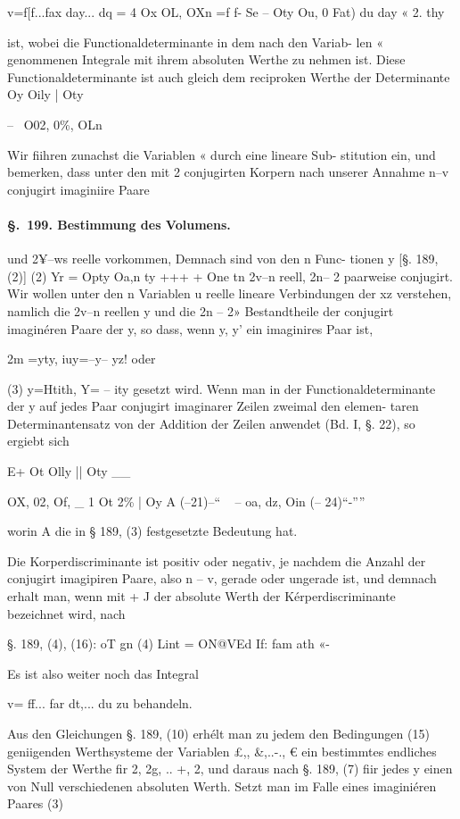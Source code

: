 \documentclass[12pt,a4paper]{article}
\theoremstyle{plain}
\theoremstyle{definition}
\begin{document}
v=f[f...fax day... dq = 4 Ox OL, OXn =f f- Se -- Oty Ou, 0 Fat) du day « 2. thy

ist, wobei die Functionaldeterminante in dem nach den Variab- len « genommenen Integrale mit ihrem absoluten Werthe zu nehmen ist. Diese Functionaldeterminante ist auch gleich dem reciproken Werthe der Determinante Oy Oily | Oty

--~ O02, 0\%, OLn

Wir fiihren zunachst die Variablen « durch eine lineare Sub- stitution ein, und bemerken, dass unter den mit 2 conjugirten Korpern nach unserer Annahme n--v conjugirt imaginiire Paare

\paragraph{\S.~199. Bestimmung des Volumens.}


und 2¥--ws reelle vorkommen, Demnach sind von den n Func- tionen y [§. 189, (2)] (2) Yr = Opty Oa,n ty +++ + One tn 2v--n reell, 2n-- 2 paarweise conjugirt. Wir wollen unter den n Variablen u reelle lineare Verbindungen der xz verstehen, namlich die 2v--n reellen y und die 2n -- 2» Bestandtheile der conjugirt imaginéren Paare der y, so dass, wenn y, y' ein imaginires Paar ist,

2m =yty, iuy=--y-- yz! oder

(3) y=Htith, Y= -- ity gesetzt wird. Wenn man in der Functionaldeterminante der y auf jedes Paar conjugirt imaginarer Zeilen zweimal den elemen- taren Determinantensatz von der Addition der Zeilen anwendet (Bd. I, §. 22), so ergiebt sich

E+ Ot Olly || Oty \_\_

OX, 02, Of, \_ 1 Ot 2\% | Oy A (--21)--`` ~ -- oa, dz, Oin (-- 24)``-''''

worin A die in § 189, (3) festgesetzte Bedeutung hat.

Die Korperdiscriminante ist positiv oder negativ, je nachdem die Anzahl der conjugirt imagipiren Paare, also n -- v, gerade oder ungerade ist, und demnach erhalt man, wenn mit + J der absolute Werth der Kérperdiscriminante bezeichnet wird, nach

§. 189, (4), (16): oT gn (4) Lint = ON@VEd If: fam ath «-

Es ist also weiter noch das Integral

v= ff... far dt,... du zu behandeln.

Aus den Gleichungen §. 189, (10) erhélt man zu jedem den Bedingungen (15) geniigenden Werthsysteme der Variablen £,, \&,..-., € ein bestimmtes endliches System der Werthe fir 2, 2g, .. +, 2, und daraus nach §. 189, (7) fiir jedes y einen von Null verschiedenen absoluten Werth. Setzt man im Falle eines imaginiéren Paares (3)
\end{document}
